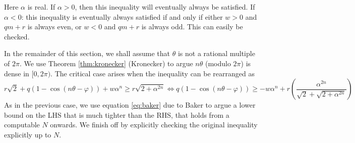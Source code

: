 Here $\alpha$ is real. If $\alpha > 0$, then this inequality will eventually always be satisfied. If $\alpha < 0$: this inequality is eventually always satisfied if and only if either $w>0$ and $qm+r$ is always even, or $w<0$ and $qm+r$ is always odd. This can easily be checked.

In the remainder of this section, we shall assume that $\theta$ is not a rational multiple of $2\pi$. We use Theorem \ref{thm:kronecker} (Kronecker) to argue $n\theta$ (modulo $2\pi$) is dense in $[0, 2\pi)$. The critical case arises when the inequality can be rearranged as
$$
r\sqrt{2} + q(1 - \cos(n\theta - \varphi)) + w\alpha^n \ge r\sqrt{2 + \alpha^{2n}} \Leftrightarrow q(1 - \cos(n\theta - \varphi)) \ge -w\alpha^n + r\left(\frac{\alpha^{2n}}{\sqrt{2}+\sqrt{2 + \alpha^{2n}}}\right)
$$
As in the previous case, we use equation \ref{eq:baker} due to Baker to argue a lower bound on the LHS that is much tighter than the RHS, that holds from a computable $N$ onwards. We finish off by explicitly checking the original inequality explicitly up to $N$.

